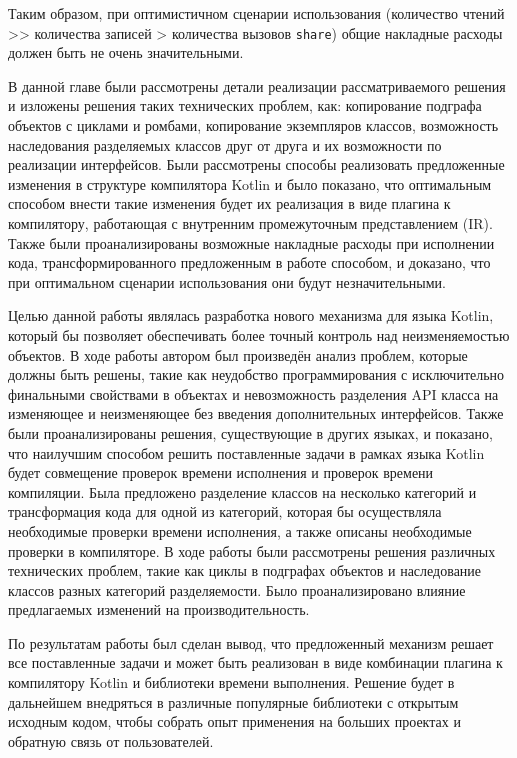 \documentclass[specification,annotation,times]{itmo-student-thesis}
\begin{document}
Таким образом, при оптимистичном сценарии использования (количество чтений >{}> количества записей > количества вызовов \texttt{share})
общие накладные расходы должен быть не очень значительными.


\chapterconclusion

В данной главе были рассмотрены детали реализации рассматриваемого решения и изложены решения таких технических проблем, как: копирование подграфа объектов с циклами и ромбами, копирование экземпляров классов, возможность наследования разделяемых классов друг от друга и их возможности по реализации интерфейсов.
Были рассмотрены способы реализовать предложенные изменения в структуре компилятора Kotlin и было показано, что оптимальным способом внести такие изменения будет их реализация в виде плагина к компилятору, работающая с внутренним промежуточным представлением (IR).
Также были проанализированы возможные накладные расходы при исполнении кода, трансформированного предложенным в работе способом, и доказано, что при оптимальном сценарии использования они будут незначительными.  


\startconclusionpage

Целью данной работы являлась разработка нового механизма для языка Kotlin, который бы позволяет обеспечивать более точный контроль над неизменяемостью объектов.
В ходе работы автором был произведён анализ проблем, которые должны быть решены, такие как неудобство программирования с исключительно финальными свойствами в объектах и невозможность разделения API класса на изменяющее и неизменяющее без введения дополнительных интерфейсов.
Также были проанализированы решения, существующие в других языках, и показано, что наилучшим способом решить поставленные задачи в рамках языка Kotlin будет совмещение проверок времени исполнения и проверок времени компиляции.
Была предложено разделение классов на несколько категорий и трансформация кода для одной из категорий, которая бы осуществляла необходимые проверки времени исполнения, а также описаны необходимые проверки в компиляторе.
В ходе работы были рассмотрены решения различных технических проблем, такие как циклы в подграфах объектов и наследование классов разных категорий разделяемости. Было проанализировано влияние предлагаемых изменений на производительность.

По результатам работы был сделан вывод, что предложенный механизм решает все поставленные задачи и может быть реализован в виде комбинации плагина к компилятору Kotlin и библиотеки времени выполнения.
Решение будет в дальнейшем внедряться в различные популярные библиотеки с открытым исходным кодом, чтобы собрать опыт применения на больших проектах и обратную связь от пользователей.


\printmainbibliography


\end{document}
